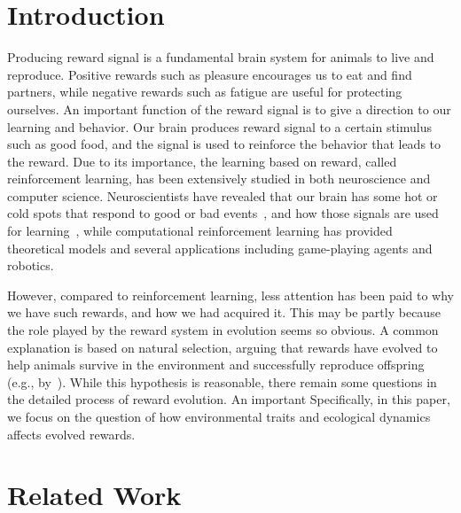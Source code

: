 \section{Introduction}

Producing reward signal is a fundamental brain system for animals to live and reproduce. Positive rewards such as pleasure encourages us to eat and find partners, while negative rewards such as fatigue are useful for protecting ourselves. An important function of the reward signal is to give a direction to our learning and behavior. Our brain produces reward signal to a certain stimulus such as good food, and the signal is used to reinforce the behavior that leads to the reward. Due to its importance, the learning based on reward, called reinforcement learning, has been extensively studied in both neuroscience and computer science. Neuroscientists have revealed that our brain has some hot or cold spots that respond to good or bad events~\cite{berridgeAffectiveNeurosciencePleasure2008}, and how those signals are used for learning~\cite{schultzNeuronalRewardDecision2015}, while computational reinforcement learning has provided theoretical models and several applications including game-playing agents and robotics.

However, compared to reinforcement learning, less attention has been paid to why we have such rewards, and how we had acquired it. This may be partly because the role played by the reward system in evolution seems so obvious. A common explanation is based on natural selection, arguing that rewards have evolved to help animals survive in the environment and successfully reproduce offspring (e.g., by~\cite{schultzNeuronalRewardDecision2015}). While this hypothesis is reasonable, there remain some questions in the detailed process of reward evolution. An important
Specifically, in this paper, we focus on the question of how environmental traits and ecological dynamics affects evolved rewards.

\section{Related Work}